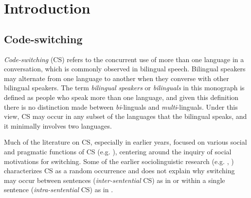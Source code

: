 \chapter{Introduction}\label{ch:1}

\section{Code-switching}\label{ch1:sect:CS}


\textit{Code-switching} (\ac{CS})  refers to the concurrent use of more than one language in a conversation, which is commonly observed in bilingual speech. Bilingual speakers may alternate from one language to another when they converse with other bilingual speakers. The term \textit{bilingual} \textit{speakers} or \textit{bilinguals} in this monograph is defined as people who speak more than one language, and given this definition there is no distinction made between \textit{bi}-linguals and \textit{multi}-linguals. Under this view, \ac{CS} may occur in any subset of the languages that the bilingual speaks, and it minimally involves two languages.

Much of the literature on \ac{CS}, especially in earlier years, focused on various social and pragmatic functions of \ac{CS} (e.g. \citealt{Auer1995,Barker1972,Gumperz1976,Zentella1995}), centering around the inquiry of social motivations for switching. Some of the earlier sociolinguistic research (e.g. \citealt{Labov1970}, \citealt{Lance1975}) characterizes \ac{CS} as a random occurrence and does not explain why switching may occur between sentences (\textit{inter-sentential} \ac{CS}) as in  or within a single sentence (\textit{intra-sentential} \ac{CS}) as in .

